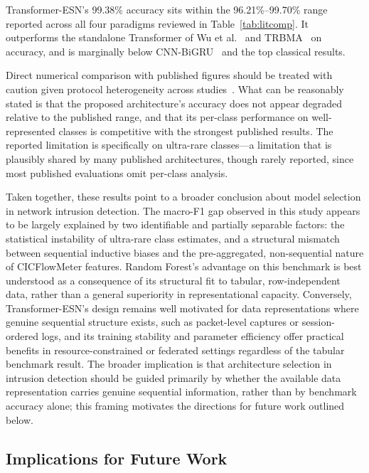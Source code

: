 \documentclass[5p,times]{elsarticle}
\begin{document}
	Transformer-ESN's 99.38\% accuracy sits within the 96.21\%--99.70\%
	range reported across all four paradigms reviewed in
	Table~\ref{tab:litcomp}. It outperforms the standalone Transformer
	of Wu et al.~\cite{rtids2022} and TRBMA~\cite{trbma2025} on accuracy,
	and is marginally below CNN-BiGRU~\cite{cnnbigru2022} and the top
	classical results.
	
	Direct numerical comparison with published figures should be treated
	with caution given protocol heterogeneity across studies~\cite{thakkar2020}.
	What can be reasonably stated is that the proposed architecture's
	accuracy does not appear degraded relative to the published range, and
	that its per-class performance on well-represented classes is
	competitive with the strongest published results. The reported
	limitation is specifically on ultra-rare classes---a limitation that is
	plausibly shared by many published architectures, though rarely
	reported, since most published evaluations omit per-class analysis.
	
	Taken together, these results point to a broader conclusion about model
	selection in network intrusion detection. The macro-F1 gap observed in
	this study appears to be largely explained by two identifiable and
	partially separable factors: the statistical instability of ultra-rare
	class estimates, and a structural mismatch between sequential inductive
	biases and the pre-aggregated, non-sequential nature of CICFlowMeter
	features. Random Forest's advantage on this benchmark is best
	understood as a consequence of its structural fit to tabular, row-independent
	data, rather than a general superiority in representational capacity.
	Conversely, Transformer-ESN's design remains well motivated for data
	representations where genuine sequential structure exists, such as
	packet-level captures or session-ordered logs, and its training
	stability and parameter efficiency offer practical benefits in
	resource-constrained or federated settings regardless of the tabular
	benchmark result. The broader implication is that architecture
	selection in intrusion detection should be guided primarily by whether
	the available data representation carries genuine sequential
	information, rather than by benchmark accuracy alone; this framing
	motivates the directions for future work outlined below.
	
	\subsection{Implications for Future Work}
	\label{subsec:implications}
	
\end{document}

